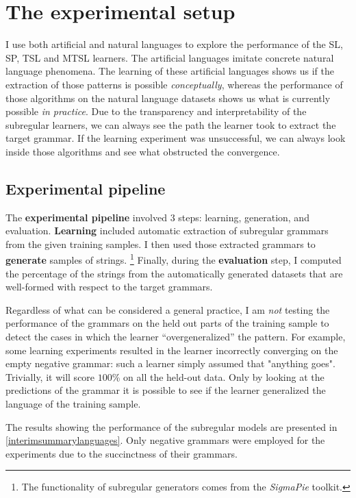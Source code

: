 \section{The experimental setup}

I use both artificial and natural languages to explore the performance of the SL, SP, TSL and MTSL learners.
The artificial languages imitate concrete natural language phenomena.
The learning of these artificial languages shows us if the extraction of those patterns is possible \emph{conceptually}, whereas the performance of those algorithms on the natural language datasets shows us what is currently possible \emph{in practice}.
Due to the transparency and interpretability of the subregular learners, we can always see the path the learner took to extract the target grammar.
If the learning experiment was unsuccessful, we can always look inside those algorithms and see what obstructed the convergence.

\subsection{Experimental pipeline}

The \textbf{experimental pipeline} involved $3$ steps: learning, generation, and evaluation.
\textbf{Learning} included automatic extraction of subregular grammars from the given training samples.
I then used those extracted grammars to \textbf{generate} samples of strings.%
\footnote{The functionality of subregular generators comes from the \emph{SigmaPie} toolkit.}
Finally, during the \textbf{evaluation} step, I computed the percentage of the strings from the automatically generated datasets that are well-formed with respect to the target grammars.

Regardless of what can be considered a general practice, I am \emph{not} testing the performance of the grammars on the held out parts of the training sample to detect the cases in which the learner ``overgeneralized'' the pattern.
For example, some learning experiments resulted in the learner incorrectly converging on the empty negative grammar: such a learner simply assumed that "anything goes".
Trivially, it will score $100$\% on all the held-out data.
Only by looking at the predictions of the grammar it is possible to see if the learner generalized the language of the training sample.

The results showing the performance of the subregular models are presented in \ref{interimsummarylanguages}.
Only negative grammars were employed for the experiments due to the succinctness of their grammars.


